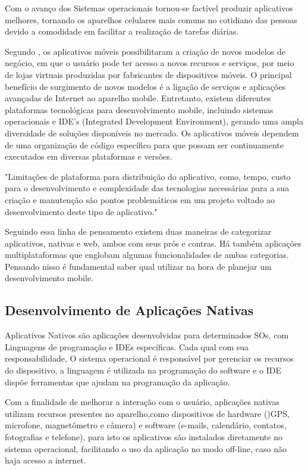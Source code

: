 	Com o avanço dos Sistemas operacionais tornou-se factível produzir aplicativos melhores, tornando os aparelhos celulares mais comuns no cotidiano das pessoas devido a comodidade em facilitar a realização de tarefas diárias.
	
	Segundo , os aplicativos móveis possibilitaram a criação de novos modelos de negócio, em que o usuário pode ter acesso a novos recursos e serviços, por meio de lojas virtuais produzidas por fabricantes de dispositivos móveis. O principal benefício de surgimento de novos modelos é a ligação de serviços e aplicações avançadas de Internet ao aparelho mobile. Entretanto, existem diferentes plataformas tecnológicas para desenvolvimento mobile, incluindo sistemas operacionais e IDE's  (Integrated Development Environment), gerando uma ampla diversidade de soluções disponíveis no mercado. Os aplicativos móveis dependem de uma organização de código específico para que possam ser continuamente executados em diversas plataformas e versões.
	
	\begin{citacao}
		"Limitações de plataforma para distribuição do aplicativo, como, tempo, custo para o desenvolvimento e complexidade das tecnologias necessárias para a sua criação e manutenção são pontos problemáticos em um projeto voltado ao desenvolvimento deste tipo de aplicativo."\cite{emdesafios}
	\end{citacao}
	
	
	Seguindo essa linha de pensamento existem duas maneiras de categorizar aplicativos, nativas e web, ambos com seus prós e contras. Há também aplicações multiplataformas que englobam algumas funcionalidades de ambas categorias. Pensando nisso é fundamental saber qual utilizar na hora de planejar um desenvolvimento mobile.
	
	\subsection{Desenvolvimento de Aplicações Nativas}
	
		Aplicativos Nativos são aplicações desenvolvidas para determinados SOs, com Linguagens de programação e IDEs específicas. Cada qual com sua responsabilidade, O sistema operacional é responsável por gerenciar os recursos do dispositivo, a linguagem é utilizada na programação do software e o IDE dispõe ferramentas que ajudam na programação da aplicação.
		
		Com a finalidade de melhorar a interação com o usuário, aplicações nativas utilizam recursos presentes no aparelho,como dispositivos de hardware ()GPS, microfone, magnetômetro e câmera) e software (e-mails,  calendário, contatos, fotografias e telefone), para isto os aplicativos são instalados diretamente no sistema operacional, facilitando o uso da aplicação no modo off-line, caso não haja acesso a internet.\cite{toledo2016desenvolvimento}
		
